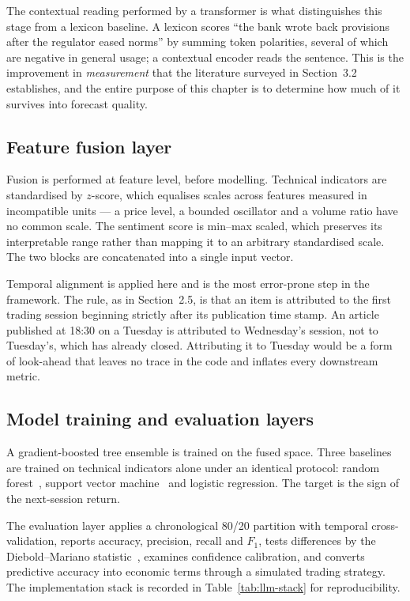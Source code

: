 The contextual reading performed by a transformer is what distinguishes this stage from a lexicon
baseline. A lexicon scores ``the bank wrote back provisions after the regulator eased norms'' by
summing token polarities, several of which are negative in general usage; a contextual encoder
reads the sentence. This is the improvement in \emph{measurement} that the literature surveyed in
Section~3.2 establishes, and the entire purpose of this chapter is to determine how much of it
survives into forecast quality.

\subsection{Feature fusion layer}

Fusion is performed at feature level, before modelling. Technical indicators are standardised by
$z$-score, which equalises scales across features measured in incompatible units --- a price
level, a bounded oscillator and a volume ratio have no common scale. The sentiment score is
min--max scaled, which preserves its interpretable range rather than mapping it to an arbitrary
standardised scale. The two blocks are concatenated into a single input vector.

Temporal alignment is applied here and is the most error-prone step in the framework. The rule,
as in Section~2.5, is that an item is attributed to the first trading session beginning strictly
after its publication time stamp. An article published at 18:30 on a Tuesday is attributed to
Wednesday's session, not to Tuesday's, which has already closed. Attributing it to Tuesday would
be a form of look-ahead that leaves no trace in the code and inflates every downstream metric.

\subsection{Model training and evaluation layers}

A gradient-boosted tree ensemble is trained on the fused space. Three baselines are trained on
technical indicators alone under an identical protocol: random forest~\cite{breiman2001}, support
vector machine~\cite{cortes1995svm} and logistic regression. The target is the sign of the
next-session return.

The evaluation layer applies a chronological 80/20 partition with temporal cross-validation,
reports accuracy, precision, recall and $F_1$, tests differences by the Diebold--Mariano
statistic~\cite{diebold1995}, examines confidence calibration, and converts predictive accuracy
into economic terms through a simulated trading strategy. The implementation stack is recorded
in Table~\ref{tab:llm-stack} for reproducibility.

